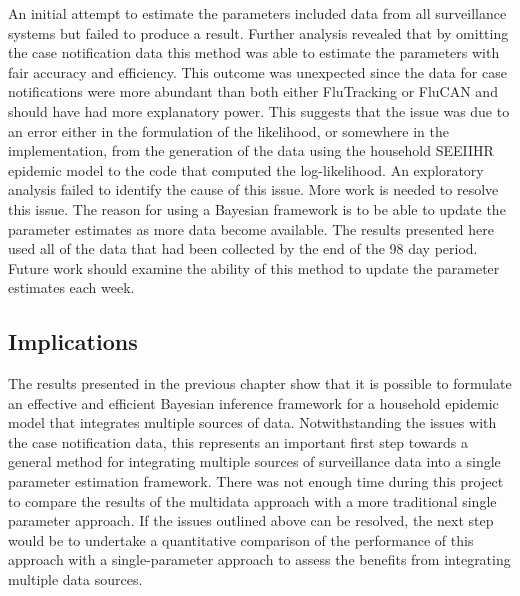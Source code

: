
An initial attempt to estimate the parameters included data from all surveillance systems but failed to produce a result. Further analysis revealed that by omitting the case notification data this method was able to estimate the parameters with fair accuracy and efficiency. This outcome was unexpected since the data for case notifications were more abundant than both either FluTracking or FluCAN and should have had more explanatory power. This suggests that the issue was due to an error either in the formulation of the likelihood, or somewhere in the implementation, from the generation of the data using the household SEEIIHR epidemic model to the code that computed the log-likelihood. An exploratory analysis failed to identify the cause of this issue. More work is needed to resolve this issue. The reason for using a Bayesian framework is to be able to update the parameter estimates as more data become available. The results presented here used all of the data that had been collected by the end of the 98 day period. Future work should examine the ability of this method to update the parameter estimates each week.

\subsection{Implications}
The results presented in the previous chapter show that it is possible to formulate an effective and efficient Bayesian inference framework for a household epidemic model that integrates multiple sources of data. Notwithstanding the issues with the case notification data, this represents an important first step towards a general method for integrating multiple sources of surveillance data into a single parameter estimation framework. There was not enough time during this project to compare the results of the multidata approach with a more traditional single parameter approach. If the issues outlined above can be resolved, the next step would be to undertake a quantitative comparison of the performance of this approach with a single-parameter approach to assess the benefits from integrating multiple data sources.

